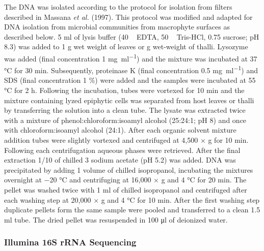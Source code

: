 \documentclass[12pt,]{article}
\begin{document}
The DNA was isolated according to the protocol for isolation from
filters described in Massana \emph{et al.} (1997). This protocol was
modified and adapted for DNA isolation from microbial communities from
macrophyte surfaces as described below. 5 \si{\ml} of lysis buffer (40
\si{\milli\Molar} EDTA, 50 \si{\milli\Molar} Tris-HCl, 0.75 \si{\Molar}
sucrose; pH 8.3) was added to 1 \si{\g} wet weight of leaves or \si{\g}
wet-weight of thalli. Lysozyme was added (final concentration 1
\si{\mg\per\ml}) and the mixture was incubated at 37 \si{\degreeCelsius}
for 30 \si{\minute}. Subsequently, proteinase K (final concentration 0.5
\si{\mg\per\ml}) and SDS (final concentration 1 \si{\percent}) were
added and the samples were incubated at 55 \si{\degreeCelsius} for 2
\si{\hour}. Following the incubation, tubes were vortexed for 10
\si{\minute} and the mixture containing lyzed epiphytic cells was
separated from host leaves or thalli by transferring the solution into a
clean tube. The lysate was extracted twice with a mixture of
phenol:chloroform:isoamyl alcohol (25:24:1; pH 8) and once with
chloroform:isoamyl alcohol (24:1). After each organic solvent mixture
addition tubes were slightly vortexed and centrifuged at 4,500 × g for
10 \si{\minute}. Following each centrifugation aqueous phases were
retrieved. After the final extraction 1/10 of chilled 3 \si{\Molar}
sodium acetate (pH 5.2) was added. DNA was precipitated by adding 1
volume of chilled isopropanol, incubating the mixtures overnight at
\num{-20} °C and centrifuging at 16,000 × g and 4 \si{\degreeCelsius}
for 20 \si{\minute}. The pellet was washed twice with 1 \si{\ml} of
chilled isopropanol and centrifuged after each washing step at 20,000 ×
g and 4 \si{\degreeCelsius} for 10 \si{\minute}. After the first washing
step duplicate pellets form the same sample were pooled and transferred
to a clean 1.5 \si{\ml} tube. The dried pellet was resuspended in 100
\si{\ul} of deionized water.

\subsubsection{Illumina 16S rRNA
Sequencing}\label{illumina-16s-rrna-sequencing}
\end{document}
